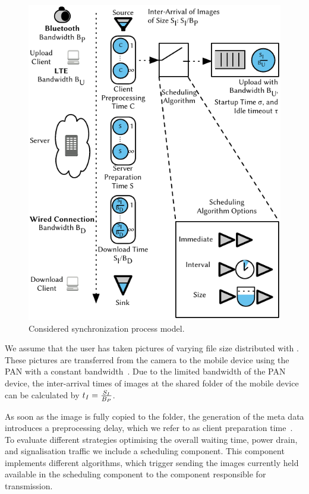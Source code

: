 \begin{figure}
\centering
\includegraphics[width=\columnwidth]{application/cloud_file_synchronization/system_model/figures/model}
\caption{Considered synchronization process model.}
\label{fig:application:cloud_file_synchronisation:system_model:model_metrics:model}
\end{figure}

We assume that the user has taken pictures of varying file size distributed with \imageFileSize.
These pictures are transferred from the camera to the mobile device using the \gls{PAN} with a constant bandwidth~\panTransferRate.
Due to the limited bandwidth \panTransferRate of the \gls{PAN} device, the inter-arrival times of images at the \dropbox shared folder of the mobile device can be calculated by \(t_I = \frac{S_I}{B_{P}}\).

As soon as the image is fully copied to the \dropbox folder, the generation of the meta data introduces a preprocessing delay, which we refer to as client preparation time~\clientpreparationtime.
To evaluate different strategies optimising the overall waiting time, power drain, and signalisation traffic we include a scheduling component.
This component implements different algorithms, which trigger sending the images currently held available in the scheduling component to the component responsible for transmission.

